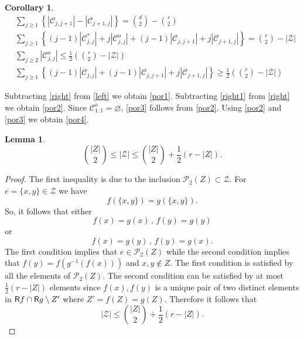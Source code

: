 \documentclass[reqno]{amsart}
\theoremstyle{theorem}
\newtheorem{lemma}[theorem]{Lemma}
\newtheorem{corollary}[theorem]{Corollary}
\theoremstyle{definition}
\theoremstyle{remark}
\def\PP{\mathscr{P}}
\def\CC{\mathscr{C}}
\newcommand{\1}{{\text{\Large $\mathfrak 1$}}}	%
\numberwithin{equation}{section}
\def\ran{{\sf R}}
\def\ZZ{\mathscr Z}
\begin{document}
\begin{corollary}
\begin{align}
&\sum_{j \ge 1} \left\{ |\CC_{j,j+1}| - |\CC_{j+1,j}|\right\} 
= \binom{d}{2}-\binom{r}{2}
\label{por1}
\\
&\sum_{j \ge 1} \left\{(j-1)|\CC_{j,j}^*| + j |\CC_{j,j}^o| 
+ (j-1)|\CC_{j,j+1}| + j |\CC_{j+1,j}| \right\} 
= \binom{r}{2} - |\ZZ|
\label{por2}
\\
&\sum_{j \ge 2} |\CC_{j, j}^o| \le \frac{1}{2} \left( \binom{r}{2} - |\ZZ| \right)
\label{por3}
\\
&
\sum_{j \ge 1} \left\{
(j-1) |\CC_{j, j}| + (j-1)|\CC_{j, j+1}| + j |\CC_{j+1, j}| \right\}
\ge \frac{1}{2} \left( \binom{r}{2} - |\ZZ| \right)
\label{por4}
\end{align}
\end{corollary}

\proof
Subtracting \eqref{right} from \eqref{left} we obtain \eqref{por1}.
Subtracting \eqref{right1} from \eqref{right} we obtain \eqref{por2}.
Since $\CC_{1, 1}^o = \varnothing$, \eqref{por3} follows from \eqref{por2}.
Using \eqref{por2} and \eqref{por3} we obtain \eqref{por4}.


\begin{lemma} 
\label{lambduplem}
\begin{equation}
\label{lambdupeq}
\binom{|Z|}{2}  \le |\ZZ| \le \binom{|Z|}{2} + \frac{1}{2} (r - |Z|).
\end{equation}
\end{lemma}
\begin{proof}
The first inequality is due to the inclusion $\PP_2(Z) \subset \ZZ$.
For $e = \{ x, y\} \in \ZZ$ we have 
\[
f(\{ x, y \}) = g(\{ x, y \}). 
\]
So, it follows that either
\[
f(x) = g(x) \, , \, f(y) = g(y)
\]
or
\[
f(x) = g(y) \, , \, f(y) = g(x).
\]
The first condition implies that $e \in \PP_2(Z)$ while the second condition
implies that $f(y) = f \left( g^{-1} \left( f(x) \right) \right)$ and $x, y \notin Z$.
The first condition is satisfied by all the elements of $\PP_2(Z)$.
The second condition can be satisfied by at most 
$\frac{1}{2} (r-|Z|)$ elements since $f(x), f(y)$ is a
unique pair of two distinct elements in $\ran f \cap \ran g \setminus Z'$ where
$Z' = f(Z) = g(Z)$. Therefore it follows that
\[
\left| \ZZ \right| \le \binom{ |Z| }{2} + \frac{1}{2} (r - |Z|).
\]
\end{proof}
\end{document}
